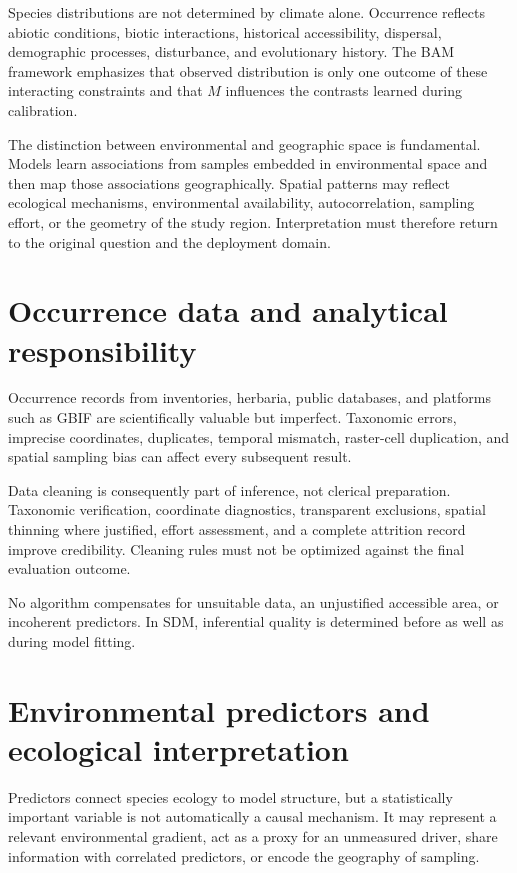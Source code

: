 Species distributions are not determined by climate alone. Occurrence reflects abiotic conditions, biotic interactions, historical accessibility, dispersal, demographic processes, disturbance, and evolutionary history. The BAM framework emphasizes that observed distribution is only one outcome of these interacting constraints and that \(M\) influences the contrasts learned during calibration.

The distinction between environmental and geographic space is fundamental. Models learn associations from samples embedded in environmental space and then map those associations geographically. Spatial patterns may reflect ecological mechanisms, environmental availability, autocorrelation, sampling effort, or the geometry of the study region. Interpretation must therefore return to the original question and the deployment domain.

\section{Occurrence data and analytical responsibility}

Occurrence records from inventories, herbaria, public databases, and platforms such as GBIF are scientifically valuable but imperfect. Taxonomic errors, imprecise coordinates, duplicates, temporal mismatch, raster-cell duplication, and spatial sampling bias can affect every subsequent result.

Data cleaning is consequently part of inference, not clerical preparation. Taxonomic verification, coordinate diagnostics, transparent exclusions, spatial thinning where justified, effort assessment, and a complete attrition record improve credibility. Cleaning rules must not be optimized against the final evaluation outcome.

\begin{atencao}[title={\faExclamationTriangle\quad Data quality precedes model complexity}]
No algorithm compensates for unsuitable data, an unjustified accessible area, or incoherent predictors. In SDM, inferential quality is determined before as well as during model fitting.
\end{atencao}

\section{Environmental predictors and ecological interpretation}

Predictors connect species ecology to model structure, but a statistically important variable is not automatically a causal mechanism. It may represent a relevant environmental gradient, act as a proxy for an unmeasured driver, share information with correlated predictors, or encode the geography of sampling.

